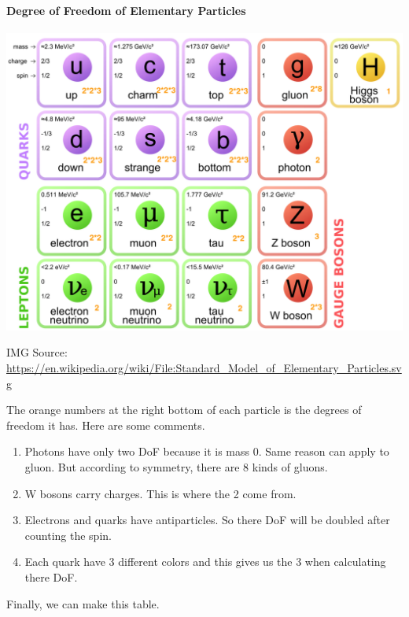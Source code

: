 \documentclass[letterpaper,10pt,english]{sphinxmanual}
\begin{document}
\paragraph{Degree of Freedom of Elementary Particles}
\label{Cosmology/cosmoIndex:degree-of-freedom-of-elementary-particles}
\includegraphics[width=1.000\linewidth]{Standard_Model_of_Elementary_Particles.png}

IMG Source: \href{https://en.wikipedia.org/wiki/File:Standard\_Model\_of\_Elementary\_Particles.svg}{https://en.wikipedia.org/wiki/File:Standard\_Model\_of\_Elementary\_Particles.svg}

The orange numbers at the right bottom of each particle is the degrees of freedom it has. Here are some comments.
\begin{enumerate}
\item {} 
Photons have only two DoF because it is mass 0. Same reason can apply to gluon. But according to symmetry, there are 8 kinds of gluons.

\item {} 
W bosons carry charges. This is where the 2 come from.

\item {} 
Electrons and quarks have antiparticles. So there DoF will be doubled after counting the spin.

\item {} 
Each quark have 3 different colors and this gives us the 3 when calculating there DoF.

\end{enumerate}

Finally, we can make this table.
\end{document}
